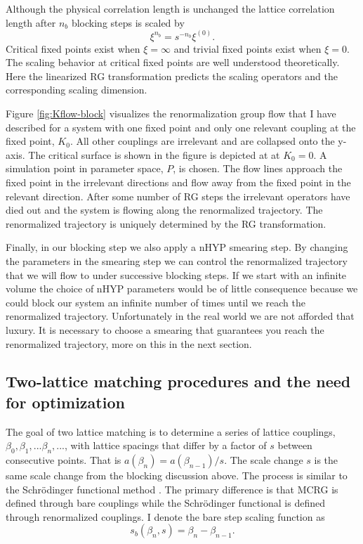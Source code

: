 Although the physical correlation length is unchanged the lattice correlation length after $n_b$ blocking steps is scaled by
\begin{equation}
  \label{eqn:xi}
  \xi^{n_b}=s^{-n_b}\xi^{(0)}.
\end{equation}
Critical fixed points exist when $\xi = \infty$ and trivial fixed points exist when $\xi = 0$.
The scaling behavior at critical fixed points are well understood theoretically.
Here the linearized RG transformation predicts the scaling operators and the corresponding scaling dimension.

Figure \ref{fig:Kflow-block} visualizes the renormalization group flow that I have described for a system with one fixed point and only one relevant coupling at the fixed point, $K_0$.
All other couplings are irrelevant and are collapsed onto the y-axis.
The critical surface is shown in the figure is depicted at at $K_0=0$.
A simulation point in parameter space, $P$, is chosen.
The flow lines approach the fixed point in the irrelevant directions and flow away from the fixed point in the relevant direction.
After some number of RG steps the irrelevant operators have died out and the system is flowing along the renormalized trajectory.
The renormalized trajectory is uniquely determined by the RG transformation.

Finally, in our blocking step we also apply a nHYP smearing step.
By changing the parameters in the smearing step we can control the renormalized trajectory that we will flow to under successive blocking steps.
If we start with an infinite volume the choice of nHYP parameters would be of little consequence because we could block our system an infinite number of times until we reach the renormalized trajectory.
Unfortunately in the real world we are not afforded that luxury.
It is necessary to choose a smearing that guarantees you reach the renormalized trajectory, more on this in the next section.

\subsection{Two-lattice matching procedures and the need for optimization} %
The goal of two lattice matching is to determine a series of lattice couplings, $\beta_0,\beta_1,...\beta_n,...$, with lattice spacings that differ by a factor of $s$ between consecutive points.
That is $a(\beta_n)=a(\beta_{n-1})/s$.
The scale change $s$ is the same scale change from the blocking discussion above.
The process is similar to the Schr\"odinger functional method \cite{}.
The primary difference is that MCRG is defined through bare couplings while the Schr\"odinger functional is defined through renormalized couplings.
I denote the bare step scaling function as 
\begin{equation}
  s_b(\beta_n,s)=\beta_n-\beta_{n-1}.
\end{equation}

